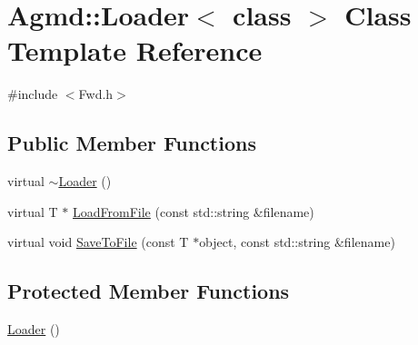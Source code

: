 \hypertarget{class_agmd_1_1_loader}{\section{Agmd\+:\+:Loader$<$ class $>$ Class Template Reference}
\label{class_agmd_1_1_loader}
}


{\ttfamily \#include $<$Fwd.\+h$>$}

\subsection*{Public Member Functions}
\begin{DoxyCompactItemize}
\item 
virtual \hyperlink{class_agmd_1_1_loader_a6ca03bd9e62c6c285546c17e972d12a8}{$\sim$\+Loader} ()
\item 
virtual T $\ast$ \hyperlink{class_agmd_1_1_loader_abf633648c648f0c6152a559c3e4be682}{Load\+From\+File} (const std\+::string \&filename)
\item 
virtual void \hyperlink{class_agmd_1_1_loader_a4350c833c893fee2029be678b04e34ae}{Save\+To\+File} (const T $\ast$object, const std\+::string \&filename)
\end{DoxyCompactItemize}
\subsection*{Protected Member Functions}
\begin{DoxyCompactItemize}
\item 
\hyperlink{class_agmd_1_1_loader_a7a5313a7f64d13988052bd7f7fbaf401}{Loader} ()
\end{DoxyCompactItemize}


